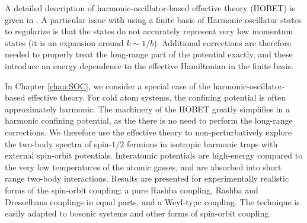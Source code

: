 A detailed description of harmonic-oscillator-based effective theory (HOBET) is given in \cite{PhysRevC.77.034005}. A particular issue with using a finite basis of Harmonic oscillator states to regularize is that the states do not accurately represent very low momentum states (it is an expansion around $k\sim 1/b$). Additional corrections are therefore needed to properly treat the long-range part of the potential exactly, and these introduce an energy dependence to the effective Hamiltonian in the finite basis.

In Chapter \ref{chap:SOC}, we consider a special case of the harmonic-oscillator-based effective theory. For cold atom systems, the confining potential is often approximately harmonic. The machinery of the HOBET greatly simplifies in a harmonic confining potential, as the there is no need to perform the long-range corrections. We therefore use the effective theory to non-perturbatively explore the two-body spectra of spin-$1/2$ fermions in isotropic harmonic traps with external spin-orbit potentials. Interatomic potentials are high-energy compared to the very low temperatures of the atomic gasses, and are absorbed into short range two-body interactions. Results are presented for experimentally realistic forms of the spin-orbit coupling: a pure Rashba coupling, Rashba and Dresselhaus couplings in equal parts, and a Weyl-type coupling. The technique is easily adapted to bosonic systems and other forms of spin-orbit coupling.